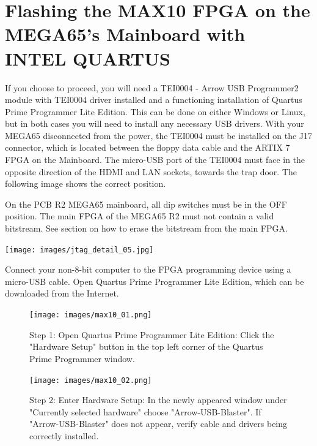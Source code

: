 \section{Flashing the MAX10 FPGA on the MEGA65's Mainboard with INTEL QUARTUS}

If you choose to proceed, you will need a TEI0004 - Arrow USB Programmer2 module with TEI0004 driver installed
and a functioning installation of Quartus Prime Programmer Lite Edition.  This can be done on either Windows
or Linux, but in both cases you will need to install any necessary USB drivers.
With your MEGA65 disconnected from the power, the TEI0004 must be installed on the J17 connector,
which is located between the floppy data cable and the ARTIX 7 FPGA on the Mainboard.
The micro-USB port of the TEI0004 must face in the opposite direction of the HDMI and LAN sockets, towards
the trap door.
The following image shows the correct position.

On the PCB R2 MEGA65 mainboard, all dip switches must be in the OFF position. The main FPGA of the MEGA65 R2 must not contain
a valid bitstream. See section  on how to erase the bitstream
from the main FPGA.

\texttt{[image: images/jtag\_detail\_05.jpg]}

Connect your non-8-bit computer to the FPGA programming device using a micro-USB cable.
Open Quartus Prime Programmer Lite Edition, which can be downloaded from the Internet.

\begin{figure}[H]
  \centering
  \texttt{[image: images/max10\_01.png]}
  \captionsetup{width=0.8\linewidth}
  \caption{Step 1: Open Quartus Prime Programmer Lite Edition:
           Click the "Hardware Setup" button in the top left corner of
           the Quartus Prime Programmer window.}
  \label{fig:max10_01}

\vspace{5mm}

  \texttt{[image: images/max10\_02.png]}
  \captionsetup{width=0.8\linewidth}
  \caption{Step 2: Enter Hardware Setup:
           In the newly appeared window under "Currently selected
           hardware" choose "Arrow-USB-Blaster".
           If "Arrow-USB-Blaster" does not appear, verify cable and
           drivers being correctly installed.}
  \label{fig:max10_02}
\end{figure}



